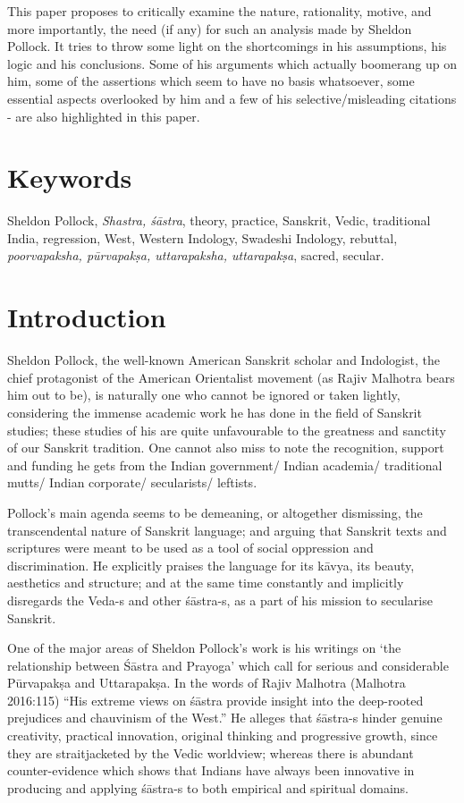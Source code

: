 This paper proposes to critically examine the nature, rationality, motive, and more importantly, the need (if any) for such an analysis made by Sheldon Pollock. It tries to throw some light on the shortcomings in his assumptions, his logic and his conclusions. Some of his arguments which actually boomerang up on him, some of the assertions which seem to have no basis whatsoever, some essential aspects overlooked by him and a few of his selective/misleading citations - are also highlighted in this paper. 

\vskip -12pt

\section*{Keywords}

Sheldon Pollock, {\sl Shastra, śāstra}, theory, practice, Sanskrit, Vedic, traditional India, regression, West, Western Indology, Swadeshi Indology, rebuttal, {\sl poorvapaksha, pūrvapakṣa, uttarapaksha, uttarapakṣa}, sacred, secular.

\vskip -12pt

\section*{Introduction}

Sheldon Pollock, the well-known American Sanskrit scholar and Indologist, the chief protagonist of the American Orientalist movement (as Rajiv Malhotra bears him out to be), is naturally one who cannot be ignored or taken lightly, considering the immense academic work he has done in the field of Sanskrit studies; these studies of his are quite unfavourable to the greatness and sanctity of our Sanskrit tradition. One cannot also miss to note the recognition, support and funding he gets from the Indian government/ Indian academia/ traditional mutts/ Indian corporate/ secularists/ leftists.

Pollock's main agenda seems to be demeaning, or altogether dismissing, the transcendental nature of Sanskrit language; and arguing that Sanskrit texts and scriptures were meant to be used as a tool of social oppression and discrimination. He explicitly praises the language for its kāvya, its beauty, aesthetics and structure; and at the same time constantly and implicitly disregards the Veda-s and other śāstra-s, as a part of his mission to secularise Sanskrit. 

One of the major areas of Sheldon Pollock's work is his writings on `the relationship between Śāstra and Prayoga' which call for serious and considerable Pūrvapakṣa and Uttarapakṣa. In the words of Rajiv Malhotra (Malhotra 2016:115) ``His extreme views on śāstra provide insight into the deep-rooted prejudices and chauvinism of the West.'' He alleges that śāstra-s hinder genuine creativity, practical innovation, original thinking and progressive growth, since they are straitjacketed by the Vedic worldview; whereas there is abundant counter-evidence which shows that Indians have always been innovative in producing and applying śāstra-s to both empirical and spiritual domains.

